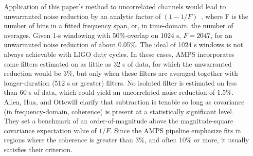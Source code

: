 
Application of this paper's method to uncorrelated channels would lead to unwarranted noise reduction by an analytic factor of $(1 - 1/F)$~\cite{AllenHuaOttewill1999}, where F is the number of bins in a fitted frequency span, or, in time-domain, the number of averages. Given 1-s windowing with 50\%-overlap on 1024 s, $F = 2047$, for an unwarranted noise reduction of about 0.05\%. The ideal of 1024 s windows is not always achievable with LIGO duty cycles. In these cases, AMPS incorporates some filters estimated on as little as 32 s of data, for which the unwarranted reduction would be 3\%, but only when these filters are averaged together with longer-duration (512 s or greater) filters. No isolated filter is estimated on less than 60 s of data, which could yield an uncorrelated noise reduction of 1.5\%. Allen, Hua, and Ottewill clarify that subtraction is tenable so long as covariance (in frequency-domain, coherence) is present at a statistically significant level. They set a benchmark of an order-of-magnitude above the magnitude-square covariance expectation value of $1/F$. Since the AMPS pipeline emphasize fits in regions where the coherence is greater than 3\%, and often 10\% or more, it usually satisfies their criterion.


